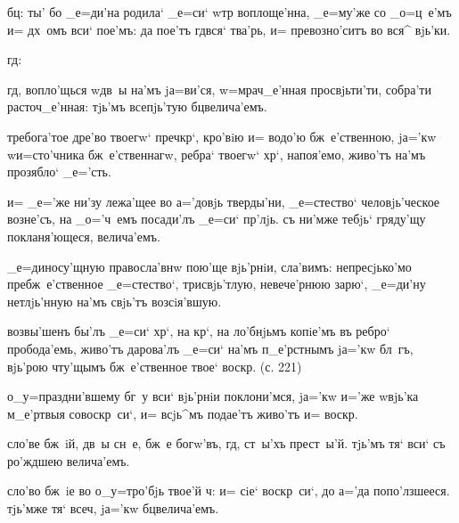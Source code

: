 бц: ты' бо _е=ди'на родила` _е=си` w\т тр 
воплоще'нна, _е=му'же со _о=ц~е'мъ и= дх~омъ вси` пое'мъ: 
да пое'тъ гд вся` тва'рь, и= превозно'ситъ во вся^ 
вjь'ки.

гд: %


гд, вопло'щься w\т дв~ы на'мъ jа=ви'ся, w=мрач_е'нная 
просвjьти'ти, собра'ти расточ_е'нная: тjь'мъ всепjь'тую 
бц велича'емъ.

требога'тое дре'во твоегw` преч кр`, кро'вiю и= 
водо'ю бж~е'ственною, jа='кw w\т и=сто'чника 
бж~е'ственнагw, ребра` твоегw` хр`, напоя'емо, 
живо'тъ на'мъ прозябло` _е='сть.

и= _е='же ни'зу лежа'щее во а='довjь тверды'ни, 
_е=стество` человjь'ческое возне'съ, на _о='ч~емъ 
посади'лъ _е=си` пр'лjь. съ ни'мже тебjь` гряду'щу 
покланя'ющеся, велича'емъ.

_е=диносу'щную правосла'внw пою'ще вjь'рнiи, сла'вимъ: 
непресjько'мо пребж~е'ственное _е=стество`, трисвjь'тлую, 
невече'рнюю зарю`, _е=ди'ну нетлjь'нную на'мъ свjь'тъ 
возсiя'вшую.


возвы'шенъ бы'лъ _е=си` хр`, на кр`, на 
ло'бнjьмъ копiе'мъ въ ребро` пробода'емь, живо'тъ 
дарова'лъ _е=си` на'мъ п_е'рстнымъ jа='кw бл~гъ, вjь'рою 
чту'щымъ бж~е'ственное твое` воскр. (с. 221)

о_у=праздни'вшему бг~у вси` вjь'рнiи поклони'мся, jа='кw 
и='же w\т вjь'ка м_е'ртвыя совоскр~си`, и= всjь^мъ 
подае'тъ живо'тъ и= воскр.


сло'ве бж~iй, дв~ы сн~е, бж~е богw'въ, гд, ст~ы'хъ 
прест~ы'й. тjь'мъ тя` вси` съ ро'ждшею велича'емъ.

сло'во бж~iе во о_у=тро'бjь твое'й ч: и= сiе` 
воскр~си`, до а='да попо'лзшееся. тjь'мже тя` всеч, 
jа='кw бц велича'емъ.

